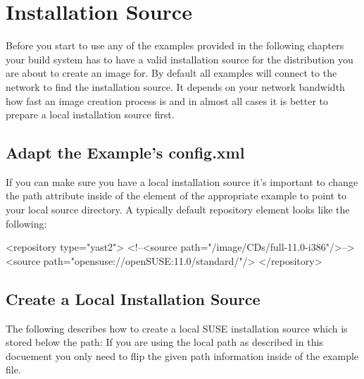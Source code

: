 \chapter{Installation Source}
\label{chapter:instsourcesetup}
\minitoc

Before you start to use any of the examples provided in the following
chapters your build system has to have a valid installation source for
the distribution you are about to create an image for.
By default all examples will connect to the network to find the
installation source. It depends on your network bandwidth how fast
an image creation process is and in almost all cases it is better
to prepare a local installation source first.

\section{Adapt the Example's config.xml}
If you can make
sure you have a local installation source it's important to change
the path attribute inside of the  element of the
appropriate example to point to your local source directory.
A typically default repository element looks like the following:

\begin{xml}
<repository type="yast2">
   <!--<source path="/image/CDs/full-11.0-i386"/>-->
   <source path="opensuse://openSUSE:11.0/standard/"/>
</repository>
\end{xml}

\section{Create a Local Installation Source}
The following describes how to create a local SUSE installation
source which is stored below the path: 
If you are using the local path as described in this docuement
you only need to flip the given path information inside of
the example  file.


